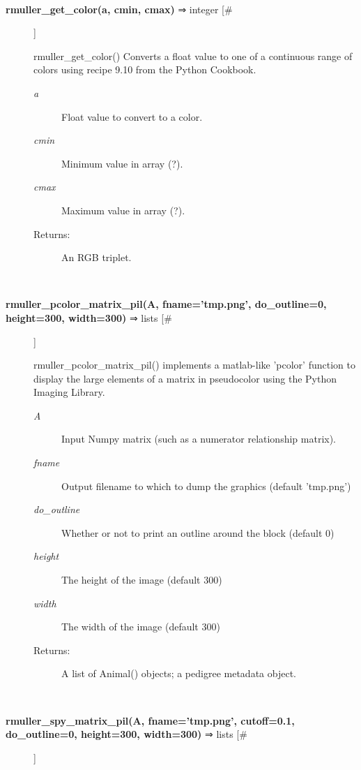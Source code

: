 \begin{description}
\begin{description}
\end{description}
\\ 

\item[\textbf{rmuller\_get\_color(a, cmin, cmax)}
 ⇒ integer [\#]]

 rmuller\_get\_color() Converts a float value to one of a continuous range of colors using recipe 9.10 from the Python Cookbook.
\begin{description}
\item[\emph{a}
] Float value to convert to a color.
\item[\emph{cmin}
] Minimum value in array (?).
\item[\emph{cmax}
] Maximum value in array (?).
\item[Returns:] An RGB triplet.

\end{description}
\\ 

\item[\textbf{rmuller\_pcolor\_matrix\_pil(A, fname='tmp.png', do\_outline=0, height=300, width=300)}
 ⇒ lists [\#]]

 rmuller\_pcolor\_matrix\_pil() implements a matlab-like 'pcolor' function to display the large elements of a matrix in pseudocolor using the Python Imaging Library.
\begin{description}
\item[\emph{A}
] Input Numpy matrix (such as a numerator relationship matrix).
\item[\emph{fname}
] Output filename to which to dump the graphics (default 'tmp.png')
\item[\emph{do\_outline}
] Whether or not to print an outline around the block (default 0)
\item[\emph{height}
] The height of the image (default 300)
\item[\emph{width}
] The width of the image (default 300)
\item[Returns:] A list of Animal() objects; a pedigree metadata object.

\end{description}
\\ 

\item[\textbf{rmuller\_spy\_matrix\_pil(A, fname='tmp.png', cutoff=0.1, do\_outline=0, height=300, width=300)}
 ⇒ lists [\#]]


\end{description}
